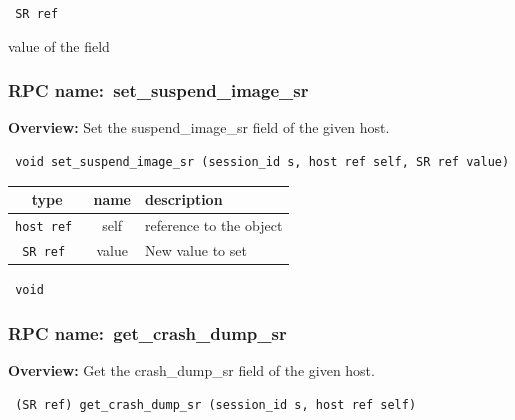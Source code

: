 \vspace{0.3cm}

{\tt 
SR ref
}


value of the field
\vspace{0.3cm}
\vspace{0.3cm}
\vspace{0.3cm}
\subsubsection{RPC name:~set\_suspend\_image\_sr}

{\bf Overview:} 
Set the suspend\_image\_sr field of the given host.

\begin{verbatim} void set_suspend_image_sr (session_id s, host ref self, SR ref value)\end{verbatim}



 
\vspace{0.3cm}
\begin{tabular}{|c|c|p{7cm}|}
 \hline
{\bf type} & {\bf name} & {\bf description} \\ \hline
{\tt host ref } & self & reference to the object \\ \hline 

{\tt SR ref } & value & New value to set \\ \hline 

\end{tabular}

\vspace{0.3cm}

{\tt 
void
}



\vspace{0.3cm}
\vspace{0.3cm}
\vspace{0.3cm}
\subsubsection{RPC name:~get\_crash\_dump\_sr}

{\bf Overview:} 
Get the crash\_dump\_sr field of the given host.

\begin{verbatim} (SR ref) get_crash_dump_sr (session_id s, host ref self)\end{verbatim}


